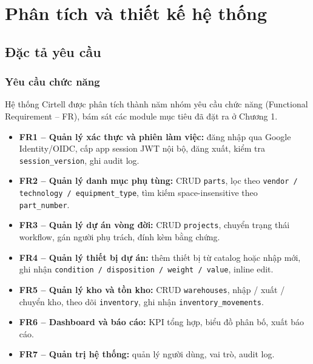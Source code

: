 \chapter{Phân tích và thiết kế hệ thống}
\label{ch:phantich}

\section{Đặc tả yêu cầu}
\label{sec:requirements}

\subsection{Yêu cầu chức năng}
Hệ thống Cirtell được phân tích thành năm nhóm yêu cầu chức năng (Functional Requirement -- FR), bám sát các module mục tiêu đã đặt ra ở Chương 1.

\begin{itemize}[leftmargin=1.2cm]
    \item \textbf{FR1 -- Quản lý xác thực và phiên làm việc:} đăng nhập qua Google Identity/OIDC, cấp app session JWT nội bộ, đăng xuất, kiểm tra \texttt{session\_version}, ghi audit log.
    \item \textbf{FR2 -- Quản lý danh mục phụ tùng:} CRUD \texttt{parts}, lọc theo \texttt{vendor / technology / equipment\_type}, tìm kiếm space-insensitive theo \texttt{part\_number}.
    \item \textbf{FR3 -- Quản lý dự án vòng đời:} CRUD \texttt{projects}, chuyển trạng thái workflow, gán người phụ trách, đính kèm bằng chứng.
    \item \textbf{FR4 -- Quản lý thiết bị dự án:} thêm thiết bị từ catalog hoặc nhập mới, ghi nhận \texttt{condition / disposition / weight / value}, inline edit.
    \item \textbf{FR5 -- Quản lý kho và tồn kho:} CRUD \texttt{warehouses}, nhập / xuất / chuyển kho, theo dõi \texttt{inventory}, ghi nhận \texttt{inventory\_movements}.
    \item \textbf{FR6 -- Dashboard và báo cáo:} KPI tổng hợp, biểu đồ phân bố, xuất báo cáo.
    \item \textbf{FR7 -- Quản trị hệ thống:} quản lý người dùng, vai trò, audit log.
\end{itemize}

